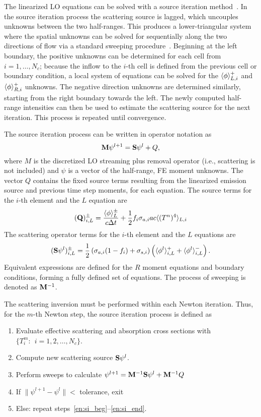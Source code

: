 The linearized LO equations can be solved with a source iteration
method~\cite{lewis,morel_dsa,mcclarren_notes}.  In the source iteration
process the scattering source is lagged, which
uncouples unknowns between the two half-ranges.  This produces a lower-triangular
system where the spatial unknowns can be solved for sequentially along the two directions of flow via a
standard sweeping procedure~\cite{lewis,morel_ldtrt}.  Beginning at the left boundary, the
positive unknowns can be determined for each cell from $i=1,\ldots,N_c$; because the
inflow to the $i$-th cell is defined from the previous cell or boundary condition, a local system
of equations can be solved for the $\langle \phi \rangle_{L,i}^+$ and $\langle \phi \rangle_{R,i}^+$ unknowns.
The negative direction unknowns are
determined similarly, starting from the
right boundary towards the left.  The newly computed half-range
intensities can then be used to estimate the scattering source for the next iteration.  This
process is repeated until convergence.  

The source iteration process can be written in operator notation as
\begin{equation}
    \mathbf{M} \psi^{l+1} = \mathbf{S}\psi^{l} + Q,
\end{equation}
where $M$ is the discretized LO streaming plus removal operator (i.e., scattering is not
included) and $\psi$ is a vector of the half-range, FE moment unknowns.  The vector $Q$
contains the fixed source terms resulting from the linearized emission source and previous
time step moments, for each equation.  The source terms for the $i$-th element and the $L$ equation
are
\begin{equation}
    (\mathbf{Q})_{i,L}^\pm = \frac{\langle \phi \rangle_L^\pm}{c\Delta t} + \frac{1}{2}f_i \sigma_{a,i} a c \langle 
        (T^{n})^4 \rangle_{L,i}
\end{equation}
The scattering operator terms for the $i$-th element and the $L$ equations are
\begin{equation}
    (\mathbf{S} \psi^l)^{\pm}_{i,L} = \frac{1}{2}\left(\sigma_{a,i} (1-f_i) + \sigma_{s,i}\right)
    \left(\langle  \phi^l \rangle_{i,L}^+ + \langle  \phi^l \rangle_{i,L}^-\right).
\end{equation}
Equivalent expressions are defined for the $R$ moment equations and boundary conditions,
forming a fully defined set of equations.  The process of sweeping is denoted as $\mathbf{M}^{-1}$.

The scattering inversion must be
performed within each Newton iteration.  Thus, for the $m$-th Newton step, the source
iteration process is defined as
\begin{enumerate}
    \item Evaluate effective scattering and absorption cross sections with
        ${\{T^m_i:\;\, i=1,2,\ldots,N_c\}}$.
    \item\label{en:si_beg} Compute new scattering source $\mathbf{S} \psi^l$.
    \item Perform sweeps to calculate $\psi^{l+1} = \mathbf{M}^{-1} \mathbf{S}\psi^{l} + \mathbf{M}^{-1} Q$
    \item\label{en:si_end} If $\|\psi^{l+1} - \psi^{l} \| < $ tolerance, exit
    \item Else: repeat steps~\ref{en:si_beg}--\ref{en:si_end}.
\end{enumerate}

